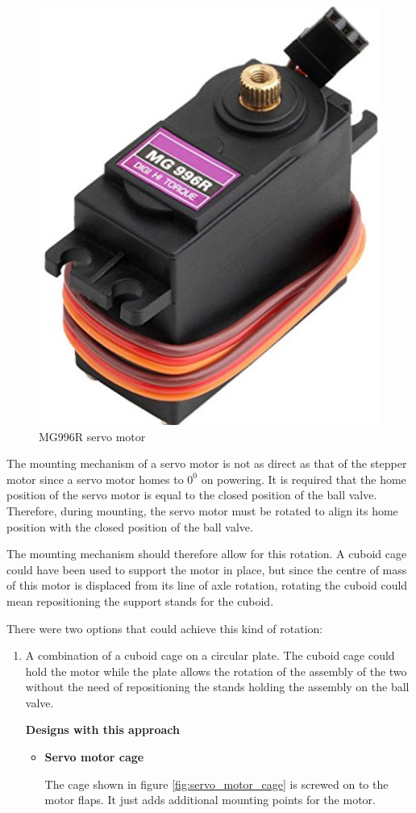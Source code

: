 \begin{enumerate}
\begin{enumerate}
\begin{table}[H]
\begin{tabular}{|l|l|}
    \end{tabular}
    \label{tab:MG996R_servo_specs}
    \end{table}
    \begin{figure}[H]
        \centering
        \includegraphics[width=.25\textwidth, height=.25\textheight]{Figures/MG996R.jpg}
        \caption[MG996R servo motor]{MG996R servo motor \cite{mg996r}}
        \label{fig:servo_motor_assembly}
    \end{figure}
    The mounting mechanism of a servo motor is not as direct as that of the stepper motor since a servo motor homes to $0^{0}$ on powering. It is required that the home position of the servo motor is equal to the closed position of the ball valve. Therefore, during mounting, the servo motor must be rotated to align its home position with the closed position of the ball valve.
    \par
    The mounting mechanism should therefore allow for this rotation. A cuboid cage could have been used to support the motor in place, but since the centre of mass of this motor is displaced from its line of axle rotation, rotating the cuboid could mean repositioning the support stands for the cuboid.
    \par
     There were two options that could achieve this kind of rotation:
     \begin{enumerate}
         \item A combination of a cuboid cage on a circular plate. The cuboid cage could hold the motor while the plate allows the rotation of the assembly of the two without the need of repositioning the stands holding the assembly on the ball valve.
         \par
         \textbf{Designs with this approach}
         \par
         \begin{itemize}
             \item \textbf{Servo motor cage}
            \par
            The cage shown in figure \ref{fig:servo_motor_cage} is screwed on to the motor flaps. It just adds additional mounting points for the motor. 

\end{itemize}
\end{enumerate}
\end{enumerate}
\end{enumerate}
